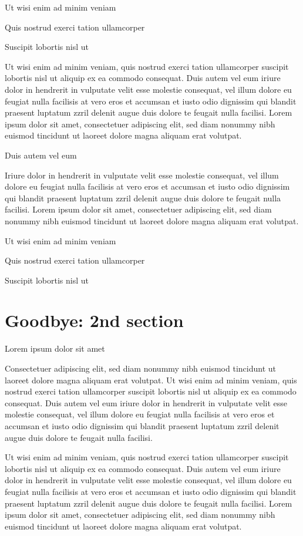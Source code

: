 \documentclass[11pt,twoside]{article}\makeatletter
\makeatletter
\renewcommand\section{\@startsection {section}{1}{\z@}%
     {-1.75ex \@plus -0.5ex \@minus -.2ex}%
     {0.5ex \@plus .2ex}%
     {\reset@font\Large\bfseries\sffamily}}
\def\DivI{\section}
\def\DivI{\chapter}
\makeatother
\begin{document}
Ut wisi enim ad minim veniam\par
Quis nostrud exerci tation ullamcorper \par
Suscipit lobortis nisl ut \par
Ut wisi enim ad minim veniam, quis nostrud exerci tation       ullamcorper suscipit lobortis nisl ut aliquip ex ea commodo       consequat. Duis autem vel eum iriure dolor in hendrerit in vulputate       velit esse molestie consequat, vel illum dolore eu feugiat nulla       facilisis at vero eros et accumsan et iusto odio dignissim qui blandit       praesent luptatum zzril delenit augue duis dolore te feugait nulla       facilisi. Lorem ipsum dolor sit amet, consectetuer adipiscing elit,       sed diam nonummy nibh euismod tincidunt ut laoreet dolore magna       aliquam erat volutpat. \par
Duis autem vel eum \par
Iriure dolor in hendrerit in vulputate velit esse molestie       consequat, vel illum dolore eu feugiat nulla facilisis at vero eros et       accumsan et iusto odio dignissim qui blandit praesent luptatum zzril       delenit augue duis dolore te feugait nulla facilisi. Lorem ipsum dolor       sit amet, consectetuer adipiscing elit, sed diam nonummy nibh euismod       tincidunt ut laoreet dolore magna aliquam erat volutpat. \par
Ut wisi enim ad minim veniam\par
Quis nostrud exerci tation ullamcorper \par
Suscipit lobortis nisl ut 
\DivI[Goodbye: 2nd section]{Goodbye: 2nd section}\label{part2}\par
Lorem ipsum dolor sit amet\par
Consectetuer adipiscing elit, sed diam nonummy nibh euismod       tincidunt ut laoreet dolore magna aliquam erat volutpat. Ut wisi enim       ad minim veniam, quis nostrud exerci tation ullamcorper suscipit       lobortis nisl ut aliquip ex ea commodo consequat. Duis autem vel eum       iriure dolor in hendrerit in vulputate velit esse molestie consequat,       vel illum dolore eu feugiat nulla facilisis at vero eros et accumsan       et iusto odio dignissim qui blandit praesent luptatum zzril delenit       augue duis dolore te feugait nulla facilisi.\par
Ut wisi enim ad minim veniam, quis nostrud exerci tation       ullamcorper suscipit lobortis nisl ut aliquip ex ea commodo       consequat. Duis autem vel eum iriure dolor in hendrerit in vulputate       velit esse molestie consequat, vel illum dolore eu feugiat nulla       facilisis at vero eros et accumsan et iusto odio dignissim qui blandit       praesent luptatum zzril delenit augue duis dolore te feugait nulla       facilisi. Lorem ipsum dolor sit amet, consectetuer adipiscing elit,       sed diam nonummy nibh euismod tincidunt ut laoreet dolore magna       aliquam erat volutpat. \par
\end{document}
